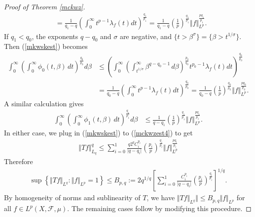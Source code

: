 \documentclass{article}
\numberwithin{equation}{section}
\newcommand{\scr}{\mathscr}
\theoremstyle{plain}
\theoremstyle{definition}
\begin{document}
\begin{proof}[Proof of Theorem \ref{mckwz}]
\begin{align*}
	&=\frac{1}{q_1-q}\left(\int_0^\infty t^{p-1}\lambda_f(t)dt\right)^{\frac{q_1}{p_1}}=\frac{1}{q_1-q}\left(\frac{1}{p}\right)^{\frac{q_1}{p_1}}\Vert f\Vert_{L^p}^{\frac{pq_1}{p_1}}.
\end{align*}
If $q_1<q_0$, the exponents $q-q_0$ and $\sigma$ are negative, and $\{t>\beta^\sigma\}=\{\beta>t^{1/\sigma}\}$. Then (\ref{mkwskest}) becomes
\begin{align*}
	\int_0^\infty\left(\int_0^\infty\phi_0(t,\beta)\,dt\right)^{\frac{q_0}{p_0}}d\beta&\leq\left(\int_0^\infty\left(\int_{t^{1/\sigma}}^\infty\beta^{q-q_0-1}\,d\beta\right)^{\frac{p_0}{q_0}}t^{p_0-1}\lambda_f(t)dt\right)^{\frac{q_0}{p_0}}\\ &=\frac{1}{q_0-q}\left(\int_0^\infty t^{p-1}\lambda_f(t)dt\right)^{\frac{q_0}{p_0}}=\frac{1}{q_0-q}\left(\frac{1}{p}\right)^{\frac{q_0}{p_0}}\Vert f\Vert_{L^p}^{\frac{pq_0}{p_0}}.
\end{align*}
A similar calculation gives
\begin{align*}
	\int_0^\infty\left(\int_0^\infty\phi_1(t,\beta)\,dt\right)^{\frac{q_1}{p_1}}d\beta &\leq\frac{1}{q-q_1}\left(\frac{1}{p}\right)^{\frac{q_1}{p_1}}\Vert f\Vert_{L^p}^{\frac{pq_1}{p_1}}.
\end{align*}
In either case, we plug in (\ref{mkwskest}) to (\ref{mckwzest4}) to get
\begin{align*}
\Vert Tf\Vert_{L_q}^q\leq\sum_{i=0}^1\frac{q2^qC_i^{p_i}}{\vert q-q_i\vert}\left(\frac{p_i}{p}\right)^{\frac{q_i}{p_i}}\Vert f\Vert_{L^p}^{\frac{pq_i}{p_i}}
\end{align*}
Therefore
\begin{align*}
	\sup\left\{\Vert Tf\Vert_{L^q}:\Vert f\Vert_{L^p}=1\right\}\leq B_{p,q}:= 2q^{1/q}\left[\sum_{i=0}^1\frac{C_i^{p_i}}{\vert q-q_i\vert}\left(\frac{p_i}{p}\right)^{\frac{q_i}{p_i}}\right]^{1/q}.
\end{align*}
By homogeneity of norms and sublinearity of $T$, we have $\Vert Tf\Vert_{L^q}\Vert\leq B_{p,q}\Vert f\Vert_{L^p}$ for all $f\in L^p(X,\scr{F},\mu)$. The remaining cases follow by modifying this procedure.


\end{proof}
\end{document}
